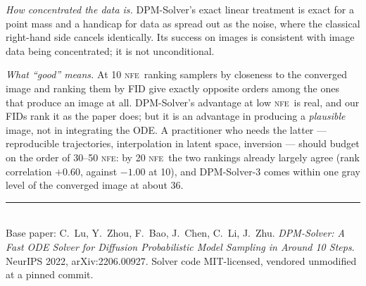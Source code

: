 \documentclass[11pt,a4paper]{article}
\newcommand{\NFE}{\textsc{nfe}}
\begin{document}
\emph{How concentrated the data is.} DPM-Solver's exact linear treatment is exact
for a point mass and a handicap for data as spread out as the noise, where the
classical right-hand side cancels identically. Its success on images is
consistent with image data being concentrated; it is not unconditional.

\emph{What ``good'' means.} At 10 \NFE\ ranking samplers by closeness to the
converged image and ranking them by FID give exactly opposite orders among the ones
that produce an image at all. DPM-Solver's advantage at low \NFE\ is real, and our
FIDs rank it as the paper does; but it is an advantage in producing a
\emph{plausible} image, not in integrating the ODE. A practitioner who needs the
latter --- reproducible trajectories, interpolation in latent space, inversion ---
should budget on the order of 30--50 \NFE: by 20 \NFE\ the two rankings already
largely agree (rank correlation $+0.60$, against $-1.00$ at 10), and DPM-Solver-3
comes within one gray level of the converged image at about 36.

\vspace{4pt}
\noindent\rule{\linewidth}{0.4pt}\\[2pt]
{\footnotesize Base paper: C.~Lu, Y.~Zhou, F.~Bao, J.~Chen, C.~Li, J.~Zhu.
\emph{DPM-Solver: A Fast ODE Solver for Diffusion Probabilistic Model Sampling in
Around 10 Steps}. NeurIPS 2022, arXiv:2206.00927. Solver code MIT-licensed,
vendored unmodified at a pinned commit.}
\end{document}

